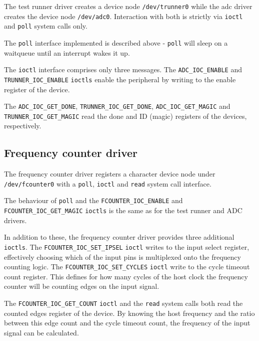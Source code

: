 The test runner driver creates a device node \texttt{/dev/trunner0} while the adc
driver creates the device node \texttt{/dev/adc0}. Interaction with both is strictly
via \texttt{ioctl} and \texttt{poll} system calls only.

The \texttt{poll} interface implemented is described above - \texttt{poll} will
sleep on a waitqueue until an interrupt wakes it up.

The \texttt{ioctl} interface comprises only three messages. The \texttt{ADC\_IOC\_ENABLE} and
\texttt{TRUNNER\_IOC\_ENABLE} \texttt{ioctls} enable the peripheral by writing to the
enable register of the device.

The \texttt{ADC\_IOC\_GET\_DONE}, \texttt{TRUNNER\_IOC\_GET\_DONE},
\texttt{ADC\_IOC\_GET\_MAGIC} and
\\
\texttt{TRUNNER\_IOC\_GET\_MAGIC} read the done and
ID (magic) registers of the devices, respectively.



\subsection{Frequency counter driver}
The frequency counter driver registers a character device node under
\\
\texttt{/dev/fcounter0}
with a \texttt{poll}, \texttt{ioctl} and \texttt{read} system call interface.

The behaviour of \texttt{poll} and the \texttt{FCOUNTER\_IOC\_ENABLE} and
\\
\texttt{FCOUNTER\_IOC\_GET\_MAGIC}
\texttt{ioctls} is the same as for the test runner and ADC drivers.

In addition to these, the frequency counter driver provides three additional \texttt{ioctls}.
The \texttt{FCOUNTER\_IOC\_SET\_IPSEL} \texttt{ioctl} writes to the input select register,
effectively choosing which of the input pins is multiplexed onto the frequency counting logic.
The \texttt{FCOUNTER\_IOC\_SET\_CYCLES} \texttt{ioctl} write to the cycle timeout count register. This
defines for how many cycles of the host clock the frequency counter will be counting edges on the
input signal.

The \texttt{FCOUNTER\_IOC\_GET\_COUNT} \texttt{ioctl} and the \texttt{read} system calls both
read the counted edges register of the device. By knowing the host frequency and the ratio
between this edge count and the cycle timeout count, the frequency of the input signal
can be calculated.


